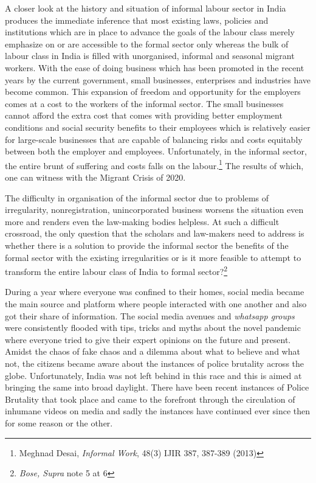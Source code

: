 \begin{multicols}{2}
\noi
A closer look at the history and situation of informal labour sector in India produces the
immediate inference that most existing laws, policies and institutions which are in place to
advance the goals of the labour class merely emphasize on or are accessible to the formal
sector only whereas the bulk of labour class in India is filled with unorganised, informal and
seasonal migrant workers. With the ease of doing business which has been promoted in the
recent years by the current government, small businesses, enterprises and industries have
become common. This expansion of freedom and opportunity for the employers comes at a
cost to the workers of the informal sector. The small businesses cannot afford the extra cost
that comes with providing better employment conditions and social security benefits to their
employees which is relatively easier for large-scale businesses that are capable of balancing
risks and costs equitably between both the employer and employees. Unfortunately, in the
informal sector, the entire brunt of suffering and costs falls on the labour.\footnote{Meghnad Desai, \textit{Informal Work}, 48(3) IJIR 387, 387-389 (2013) } The results of
which, one can witness with the Migrant Crisis of 2020.

\noi
The difficulty in organisation of the informal sector due to problems of irregularity, nonregistration, unincorporated business worsens the situation even more and renders even the
law-making bodies helpless. At such a difficult crossroad, the only question that the scholars
and law-makers need to address is whether there is a solution to provide the informal sector the benefits of the formal sector with the existing irregularities or is it more feasible to
attempt to transform the entire labour class of India to formal sector?\footnote{\textit{Bose, Supra} note 5 at 6}


\noi
During a year where everyone was confined to their homes, social media became the main
source and platform where people interacted with one another and also got their share of
information. The social media avenues and \textit{whatsapp groups} were consistently flooded with
tips, tricks and myths about the novel pandemic where everyone tried to give their expert
opinions on the future and present. Amidst the chaos of fake chaos and a dilemma about what
to believe and what not, the citizens became aware about the instances of police brutality
across the globe. Unfortunately, India was not left behind in this race and this is aimed at
bringing the same into broad daylight. There have been recent instances of Police Brutality
that took place and came to the forefront through the circulation of inhumane videos on
media and sadly the instances have continued ever since then for some reason or the other. 


\end{multicols}
